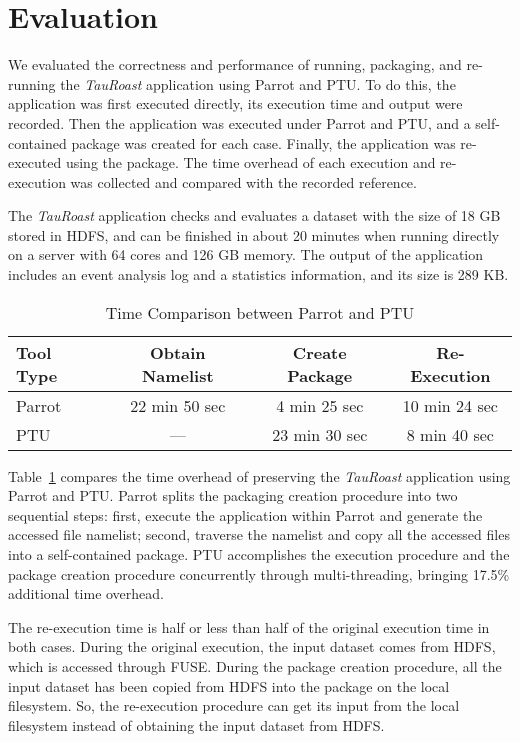 \section{Evaluation}

We evaluated the correctness and performance of running, packaging, and re-running the \emph{TauRoast} application using Parrot and PTU.
To do this, the application was first executed directly, its execution time and output were recorded. Then the application was executed under Parrot and PTU, and a self-contained package was created for each case. Finally, the application was re-executed using the package. The time overhead of each execution and re-execution was collected and compared with the recorded reference.

The \emph{TauRoast} application checks and evaluates a dataset with the size of 18 GB stored in HDFS, and can be finished in about 20 minutes when running directly on a server with 64 cores and 126 GB memory. The output of the application includes an event analysis log and a statistics information, and its size is 289 KB.

\begin{table}
\small
    \centering
    \begin{tabular}{lccc}
    \hline
    \bf Tool Type & \bf Obtain Namelist & \bf Create Package & \bf Re-Execution \\ \hline
	Parrot & 22 min 50 sec  & 4 min 25 sec & 10 min 24 sec \\ \hline
	PTU & --- & 23 min 30 sec & 8 min 40 sec \\ \hline 
    \end{tabular}
    \normalsize
    \caption{Time Comparison between Parrot and PTU}
    \label{table:parrot_ptu}
\end{table}    

Table~\ref{table:parrot_ptu} compares the time overhead of preserving the \emph{TauRoast} application using Parrot and PTU.
Parrot splits the packaging creation procedure into two sequential steps: first, execute the application within Parrot and generate the accessed file namelist; second, traverse the namelist and copy all the accessed files into a self-contained package.
PTU accomplishes the execution procedure and the package creation procedure concurrently through multi-threading, bringing 17.5\% additional time overhead.

The re-execution time is half or less than half of the original execution time in both cases. During the original execution, the input dataset comes from HDFS, which is accessed through FUSE. During the package creation procedure, all the input dataset has been copied from HDFS into the package on the local filesystem. So, the re-execution procedure can get its input from the local filesystem instead of obtaining the input dataset from HDFS.

